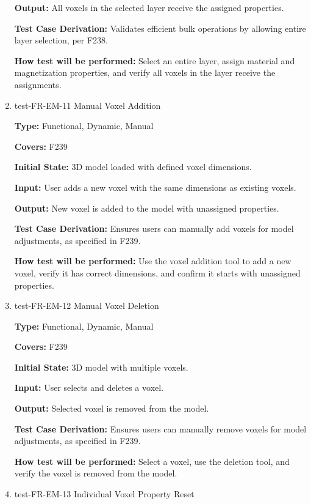 \documentclass[12pt, titlepage]{article}
\begin{document}
\begin{enumerate}
\textbf{Output:} All voxels in the selected layer receive the assigned properties.

\textbf{Test Case Derivation:} Validates efficient bulk operations by allowing entire layer selection, per F238.
					
\textbf{How test will be performed:} Select an entire layer, assign material and magnetization properties, and verify all voxels in the layer receive the assignments.

\item{test-FR-EM-11 Manual Voxel Addition\\}

\textbf{Type:} Functional, Dynamic, Manual

\textbf{Covers:} F239
					
\textbf{Initial State:} 3D model loaded with defined voxel dimensions.
					
\textbf{Input:} User adds a new voxel with the same dimensions as existing voxels.
					
\textbf{Output:} New voxel is added to the model with unassigned properties.

\textbf{Test Case Derivation:} Ensures users can manually add voxels for model adjustments, as specified in F239.
					
\textbf{How test will be performed:} Use the voxel addition tool to add a new voxel, verify it has correct dimensions, and confirm it starts with unassigned properties.

\item{test-FR-EM-12 Manual Voxel Deletion\\}

\textbf{Type:} Functional, Dynamic, Manual

\textbf{Covers:} F239
					
\textbf{Initial State:} 3D model with multiple voxels.
					
\textbf{Input:} User selects and deletes a voxel.
					
\textbf{Output:} Selected voxel is removed from the model.

\textbf{Test Case Derivation:} Ensures users can manually remove voxels for model adjustments, as specified in F239.
					
\textbf{How test will be performed:} Select a voxel, use the deletion tool, and verify the voxel is removed from the model.

\item{test-FR-EM-13 Individual Voxel Property Reset\\}


\end{enumerate}
\end{document}
